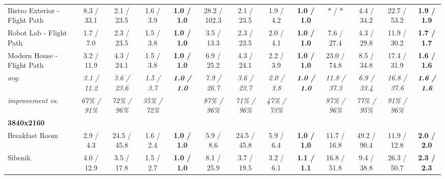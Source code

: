 \begin{table*}[t]
\begin{tabular}{l cccc|cccc|cccc}
		Bistro Exterior - Flight Path & 8.3 / 33.1           & 2.1 / 23.5           & 1.6 / 3.9            & \textbf{1.0 / 1.0}   & 28.2 / 102.3         & 2.1 / 23.5           & 1.9 / 4.2            & \textbf{1.0 / 1.0}   & * / *                & 4.4 / 34.2           & 22.7 / 53.2          & \textbf{1.9 / 1.9}   \\
		Robot Lab - Flight Path       & 1.7 / 7.0            & 2.3 / 23.5           & 1.5 / 3.8            & \textbf{1.0 / 1.0}   & 3.5 / 13.3           & 2.3 / 23.5           & 2.0 / 4.1            & \textbf{1.0 / 1.0}   & 7.6 / 27.4           & 4.3 / 29.8           & 11.9 / 30.2          & \textbf{1.7 / 1.7}   \\
		Modern House - Flight Path    & 3.2 / 11.9           & 4.3 / 24.1           & 1.5 / 3.8            & \textbf{1.0 / 1.0}   & 6.9 / 25.2           & 4.3 / 24.1           & 2.2 / 3.9            & \textbf{1.0 / 1.0}   & 23.0 / 74.8          & 8.5 / 34.8           & 17.4 / 31.9          & \textbf{1.6 / 1.6}   \\
		\hline
		\textit{avg.}                 & \textit{3.1 / 11.2}  & \textit{3.6 / 23.6}  & \textit{1.5 / 3.7}   & \textit{\textbf{1.0 / 1.0}} & \textit{7.9 / 26.7}  & \textit{3.6 / 23.7}  & \textit{2.0 / 3.8}   & \textit{\textbf{1.0 / 1.0}} & \textit{11.8 / 37.3} & \textit{6.9 / 33.4}  & \textit{16.8 / 37.6}  & \textit{\textbf{1.6 / 1.6}} \\
		\textit{improvement vs.}      & \textit{67\% / 91\%} & \textit{72\% / 96\%} & \textit{35\% / 72\%} & \textit{}                   & \textit{87\% / 96\%} & \textit{71\% / 96\%} & \textit{47\% / 73\%} & \textit{}                   & \textit{87\% / 96\%} & \textit{77\% / 95\%} & \textit{91\% / 96\%}  & \\
		\hline
		\textbf{3840x2160}            &                      &                      &                      &                      &                      &                      &                      &                      &                      &                      &                      &                      \\
		Breakfast Room                & 2.9 / 4.3            & 24.5 / 45.8          & 1.6 / 2.4            & \textbf{1.0 / 1.0}   & 5.9 / 8.6            & 24.5 / 45.8          & 5.9 / 6.4            & \textbf{1.0 / 1.0}   & 11.7 / 16.8          & 49.2 / 90.4          & 11.9 / 12.8          & \textbf{2.0 / 2.0}   \\
		Sibenik                       & 4.0 / 12.9           & 3.5 / 17.8           & 1.5 / 2.7            & \textbf{1.0 / 1.0}   & 8.1 / 25.9           & 3.7 / 19.5           & 3.2 / 6.1            & \textbf{1.1 / 1.1}   & 16.8 / 51.8          & 9.4 / 38.8           & 26.3 / 50.7          & \textbf{2.3 / 2.3}   \\

\end{tabular}
\end{table*}
